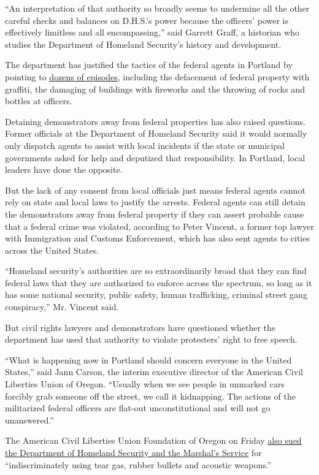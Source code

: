 ``An interpretation of that authority so broadly seems to undermine all
the other careful checks and balances on D.H.S.'s power because the
officers' power is effectively limitless and all encompassing,'' said
Garrett Graff, a historian who studies the Department of Homeland
Security's history and development.

The department has justified the tactics of the federal agents in
Portland by pointing to
\href{https://www.dhs.gov/news/2020/07/16/acting-secretary-wolf-condemns-rampant-long-lasting-violence-portland}{dozens
of episodes}, including the defacement of federal property with
graffiti, the damaging of buildings with fireworks and the throwing of
rocks and bottles at officers.

Detaining demonstrators away from federal properties has also raised
questions. Former officials at the Department of Homeland Security said
it would normally only dispatch agents to assist with local incidents if
the state or municipal governments asked for help and deputized that
responsibility. In Portland, local leaders have done the opposite.

But the lack of any consent from local officials just means federal
agents cannot rely on state and local laws to justify the arrests.
Federal agents can still detain the demonstrators away from federal
property if they can assert probable cause that a federal crime was
violated, according to Peter Vincent, a former top lawyer with
Immigration and Customs Enforcement, which has also sent agents to
cities across the United States.

``Homeland security's authorities are so extraordinarily broad that they
can find federal laws that they are authorized to enforce across the
spectrum, so long as it has some national security, public safety, human
trafficking, criminal street gang conspiracy,'' Mr. Vincent said.

But civil rights lawyers and demonstrators have questioned whether the
department has used that authority to violate protesters' right to free
speech.

``What is happening now in Portland should concern everyone in the
United States,'' said Jann Carson, the interim executive director of the
American Civil Liberties Union of Oregon. ``Usually when we see people
in unmarked cars forcibly grab someone off the street, we call it
kidnapping. The actions of the militarized federal officers are flat-out
unconstitutional and will not go unanswered.''

The American Civil Liberties Union Foundation of Oregon on Friday
\href{https://aclu-or.org/sites/default/files/field_documents/07-17-20_-_second_amended_complaint_0.pdf}{also
sued the Department of Homeland Security and the Marshal's Service} for
``indiscriminately using tear gas, rubber bullets and acoustic
weapons.''

